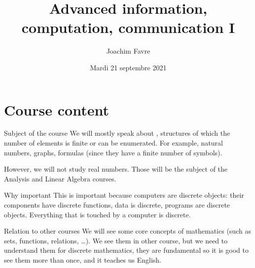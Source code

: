 \documentclass{article}
\title{Advanced information, computation, communication I}
\author{Joachim Favre}
\date{Mardi 21 septembre 2021}
\begin{document}
\maketitle


\section{Course content}

\begin{parag}{Subject of the course}
    We will mostly speak about , structures of which the number of elements is finite or can be enumerated. For example, natural numbers, graphs, formulas (since they have a finite number of symbols).

    However, we will not study real numbers. Those will be the subject of the Analysis and Linear Algebra courses.
\end{parag}

\begin{parag}{Why important}
    This is important because computers are discrete objects: their components have discrete functions, data is discrete, programs are discrete objects. Everything that is touched by a computer is discrete.
\end{parag}

\begin{parag}{Relation to other courses}
    We will see some core concepts of mathematics (such as sets, functions, relations, \ldots). We see them in other course, but we need to understand them for discrete mathematics, they are fundamental so it is good to see them more than once, and it teaches us English.
\end{parag}
\end{document}
